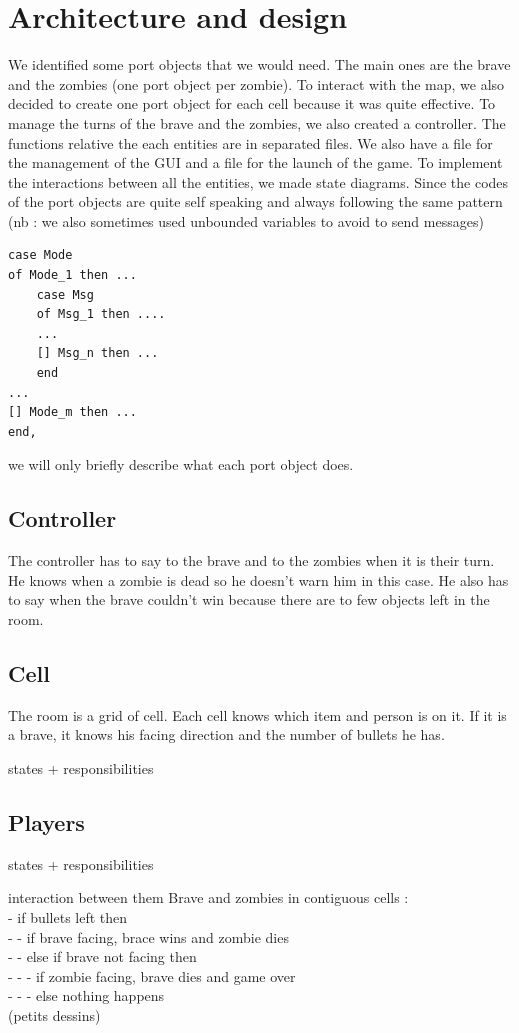 \documentclass[11pt,a4paper]{article}
\begin{document}
\section{Architecture and design}

We identified some port objects that we would need. The main ones are the brave and the zombies (one port object per zombie). To interact with the map, we also decided to create one port object for each cell because it was quite effective. To manage the turns of the brave and the zombies, we also created a controller. The functions relative the each entities are in separated files. We also have a file for the management of the GUI and a file for the launch of the game. To implement the interactions between all the entities, we made state diagrams. Since the codes of the port objects are quite self speaking and always following the same pattern (nb : we also sometimes used unbounded variables to avoid to send messages)
\begin{lstlisting}[basicstyle=\ttfamily\footnotesize]
case Mode
of Mode_1 then ...
	case Msg
	of Msg_1 then ....
	...
	[] Msg_n then ...
	end
...	
[] Mode_m then ...
end,
\end{lstlisting}
we will only briefly describe what each port object does. 
	

\subsection{Controller}
The controller has to say to the brave and to the zombies when it is their turn. He knows when a zombie is dead so he doesn't warn him in this case.  He also has to say when the brave couldn't win because there are to few objects left in the room. 

\subsection{Cell}
The room is a grid of cell. Each cell knows which item and person is on it. If it is a brave, it knows his facing direction and the number of bullets he has.

states + responsibilities


\subsection{Players}
states + responsibilities

interaction between them
Brave and zombies in contiguous cells : \\
- if bullets left then \\
- - if brave facing, brace wins  and zombie dies\\
- - else if brave not facing then \\
- - - if zombie facing, brave dies and game over \\
- - - else nothing happens \\
(petits dessins)
\end{document}
